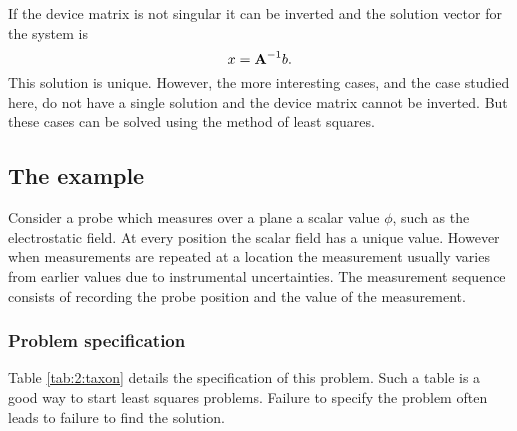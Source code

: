 If the device matrix is not singular it can be inverted and the solution vector for the system is
\begin{equation}
  x=\textbf{A}^{\mathrm{-1}}b.
\end{equation}
This solution is unique. However, the more interesting cases, and the case studied here, do not have a single solution and the device matrix cannot be inverted. But these cases can be solved using the method of least squares.

\subsection{The example}
Consider a probe which measures over a plane a scalar value $\phi$, such as the electrostatic field. At every position the scalar field has a unique value. However when measurements are repeated at a location the measurement usually varies from earlier values due to instrumental uncertainties. The measurement sequence consists of recording the probe position and the value of the measurement. 

\subsubsection{Problem specification}
Table \eqref{tab:2:taxon} details the specification of this problem. Such a table is a good way to start least squares problems. Failure to specify the problem often leads to failure to find the solution.

\begin{table}[h]
\begin{center}
\end{center}
\caption{Bilinear fit parameters. Start the solution by specifying the problem. Identify the model and the merit function. Distinguish between inputs and outputs.}
\label{tab:2:taxon}
\end{table}%

